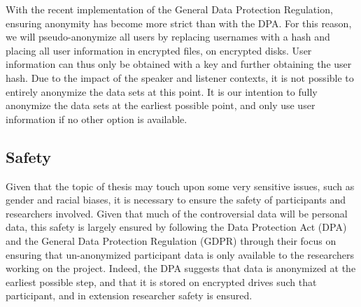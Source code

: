 \noindent With the recent implementation of the General Data Protection Regulation, ensuring anonymity has become more strict than with the DPA. For this reason, we will pseudo-anonymize all users by replacing usernames with a hash and placing all user information in encrypted files, on encrypted disks. User information can thus only be obtained with a key and further obtaining the user hash. Due to the impact of the speaker and listener contexts, it is not possible to entirely anonymize the data sets at this point. It is our intention to fully anonymize the data sets at the earliest possible point, and only use user information if no other option is available.

%


\subsection{Safety}\label{sec:ethics:safety}
Given that the topic of thesis may touch upon some very sensitive issues, such as gender and racial biases, it is necessary to ensure the safety of participants and researchers involved. Given that much of the controversial data will be personal data, this safety is largely ensured by following the Data Protection Act (DPA) and the General Data Protection Regulation (GDPR) through their focus on ensuring that un-anonymized participant data is only available to the researchers working on the project. Indeed, the DPA suggests that data is anonymized at the earliest possible step, and that it is stored on encrypted drives such that participant, and in extension researcher safety is ensured.


